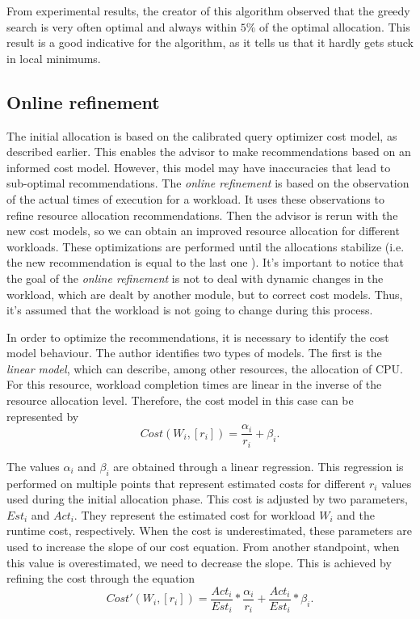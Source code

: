 From experimental results, the creator of this algorithm observed that the greedy search is very often optimal and always within $5\%$ of the optimal allocation. This result is a good indicative for the algorithm, as it tells us that it hardly gets stuck in local minimums.



\subsection{Online refinement}
\label{subsec:ref}

The initial allocation is based on the calibrated query optimizer cost model, as described earlier. This enables the advisor to make recommendations based on an informed cost model. However, this model may have inaccuracies that lead to sub-optimal recommendations. The  \textit{online refinement} is based on the observation of the actual times of execution for a workload. It uses these observations to refine resource allocation recommendations. Then the advisor is rerun with the new cost models, so  we can obtain an improved resource allocation for different workloads. These optimizations are performed until the allocations stabilize (i.e. the new recommendation is equal to the last one ). It's important to notice that the goal of the \textit{online refinement} is not to deal with dynamic changes in the workload, which are dealt by another module, but to correct cost models. Thus, it's assumed that the workload is not going to change during this process. 

In order to optimize the recommendations, it is necessary to identify the cost model behaviour. The author identifies two types of models. The first is the \textit{linear model}, which can describe, among other resources, the allocation of CPU. For this resource, workload completion times are linear in the inverse of the resource allocation level. Therefore, the cost model in this case can be represented by
\[
 Cost(W_{i}, [r_{i}]) = \frac{\alpha_{i}}{r_{i}} +\beta_{i}.
\]

The values $\alpha_{i}$ and $\beta_{i}$ are obtained through a linear regression. This regression is performed on multiple points that represent estimated costs for different $r_{i}$ values used during the initial allocation phase. This cost is adjusted by two parameters, $Est_{i}$ and $Act_{i}$. They represent the estimated cost for workload $W_{i}$ and the runtime cost, respectively. When the cost is underestimated, these parameters are used to increase the slope of our cost equation. From another standpoint, when this value is overestimated, we need to decrease the slope. This is achieved by refining the cost through the equation
\[
  Cost'(W_{i}, [r_{i}]) = \frac{Act_{i}}{Est_{i}} * \frac{\alpha_{i}}{r_{i}} + \frac{Act_{i}}{Est_{i}} * \beta_{i}.
\]

